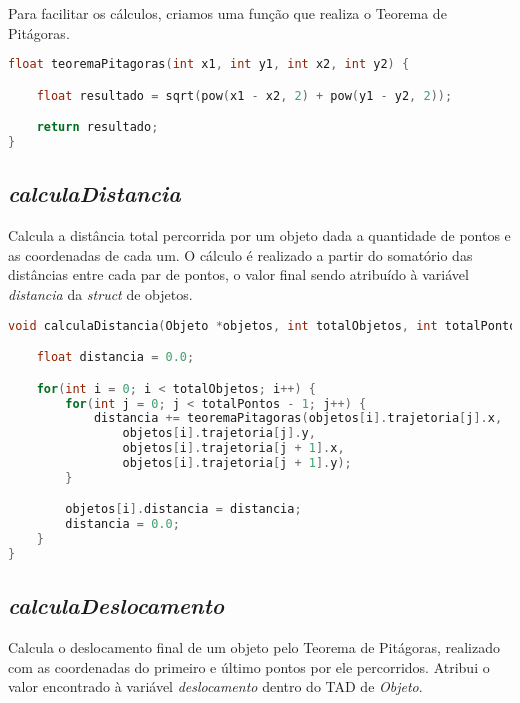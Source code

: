 \documentclass{article}
\begin{document}
\hspace*{\parindent}Para facilitar os cálculos, criamos uma função que realiza o Teorema de Pitágoras.

\begin{lstlisting}[label={lst:cod1},language=C]
float teoremaPitagoras(int x1, int y1, int x2, int y2) {

    float resultado = sqrt(pow(x1 - x2, 2) + pow(y1 - y2, 2));

    return resultado;
}
\end{lstlisting}


\subsection{\textit{calculaDistancia}}

\hspace*{\parindent}Calcula a distância total percorrida por um objeto dada a quantidade de pontos e as coordenadas de cada um. O cálculo é realizado a partir do somatório das distâncias entre cada par de pontos, o valor final sendo atribuído à variável \textit{distancia} da \textit{struct} de objetos.

\begin{lstlisting}[label={lst:cod1},language=C]
void calculaDistancia(Objeto *objetos, int totalObjetos, int totalPontos) {

    float distancia = 0.0;

    for(int i = 0; i < totalObjetos; i++) {
        for(int j = 0; j < totalPontos - 1; j++) {
            distancia += teoremaPitagoras(objetos[i].trajetoria[j].x,
                objetos[i].trajetoria[j].y,
                objetos[i].trajetoria[j + 1].x,
                objetos[i].trajetoria[j + 1].y);
        }

        objetos[i].distancia = distancia;
        distancia = 0.0;
    }
}
\end{lstlisting}


\subsection{\textit{calculaDeslocamento}}

\hspace*{\parindent}Calcula o deslocamento final de um objeto pelo Teorema de Pitágoras, realizado com as coordenadas do primeiro e último pontos por ele percorridos. Atribui o valor encontrado à variável \textit{deslocamento} dentro do TAD de \textit{Objeto}.
\end{document}
